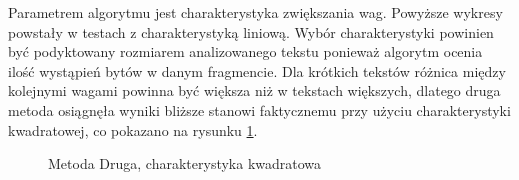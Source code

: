 \documentclass[12pt,a4paper]{article} %
\begin{document}
\newpage

Parametrem algorytmu jest charakterystyka zwiększania wag. Powyższe wykresy powstały w testach z charakterystyką liniową. Wybór charakterystyki powinien być podyktowany rozmiarem analizowanego tekstu ponieważ algorytm ocenia ilość wystąpień bytów w danym fragmencie. Dla krótkich tekstów różnica między kolejnymi wagami powinna być większa niż w tekstach większych, dlatego druga metoda osiągnęła wyniki bliższe stanowi faktycznemu przy użyciu charakterystyki kwadratowej, co pokazano na rysunku \ref{fig:met2_n^2}.

\begin{figure}[!h]
\caption{Metoda Druga, charakterystyka kwadratowa}
\label{fig:met2_n^2}
\centering
\end{figure}
\newpage
% 


\end{document}
